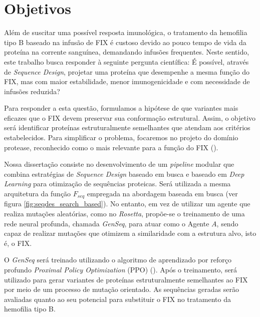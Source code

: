 \section{Objetivos}
\label{section:Proposta}

Além de suscitar uma possível resposta imunológica, 
o tratamento da hemofilia tipo B baseado na infusão de FIX
é custoso devido ao pouco tempo de vida da proteína na corrente sanguínea, demandando infusões frequentes. 
Neste sentido, este trabalho busca responder à seguinte pergunta científica: 
É possível, através de \textit{Sequence Design}, projetar uma proteína que desempenhe a mesma função do FIX, 
mas com maior estabilidade, menor imunogenicidade e com necessidade de infusões reduzida? 

Para responder a esta questão, formulamos a hipótese de que 
variantes mais eficazes que o FIX devem preservar sua conformação estrutural.
Assim, o objetivo será identificar proteínas estruturalmente semelhantes que atendam aos critérios estabelecidos.
Para simplificar o problema, focaremos no projeto do domínio protease, 
reconhecido como o mais relevante para a função do FIX (\cite{FIX}).

Nossa dissertação consiste no desenvolvimento de um \textit{pipeline} modular 
que combina estratégias de \textit{Sequence Design} baseado em busca 
e baseado em \textit{Deep Learning} para otimização de sequências proteicas. 
Será utilizada a mesma arquitetura da função $F_{seq}$ empregada na abordagem baseada em busca (ver figura \ref{fig:seqdes_search_based}).
No entanto, em vez de utilizar um agente que realiza mutações aleatórias,
como no \textit{Rosetta}, propõe-se o treinamento de uma rede neural profunda, chamada \textit{GenSeq},
para atuar como o Agente $A$,
sendo capaz de realizar mutações que otimizem a similaridade com a estrutura alvo, isto é, o FIX.

O \textit{GenSeq} será treinado utilizando o algoritmo de aprendizado por reforço profundo
\textit{Proximal Policy Optimization} (PPO) (\cite{PPO}).
Após o treinamento, será utilizado para gerar variantes 
de proteínas estruturalmente semelhantes ao FIX por meio de um processo de mutação orientado. 
As sequências geradas serão avaliadas quanto ao seu potencial para substituir o FIX no tratamento da hemofilia tipo B.

